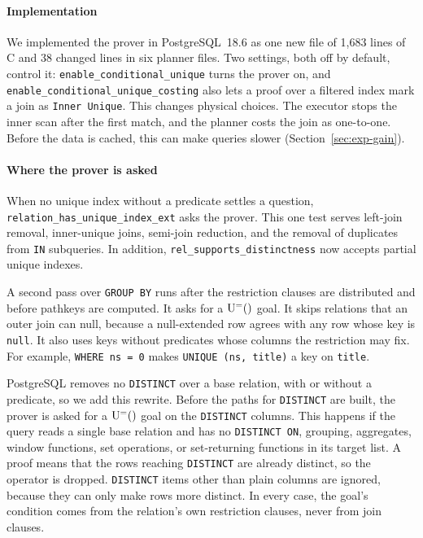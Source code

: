 \documentclass[conference]{IEEEtran}
\theoremstyle{definition}
\newcommand{\sql}[1]{\texttt{#1}}
\newcommand{\nul}{\texttt{null}}
\newcommand{\Ueq}[1]{\mathrm{U}^{=}(#1)}
\begin{document}
\paragraph*{Implementation} We implemented the prover in PostgreSQL~18.6 as one new file of 1{,}683 lines of C and
38 changed lines in six planner files. Two settings, both off by default, control it: \sql{enable\_conditional\_unique} turns the prover on,
and \sql{enable\_conditional\_unique\_costing} also lets a proof over a filtered index mark a join as
\sql{Inner Unique}. This changes physical choices. The executor stops the
inner scan after the first match, and the planner costs the join as one-to-one. Before the data is cached, this can make
queries slower (Section~\ref{sec:exp-gain}).

\paragraph*{Where the prover is asked} When no unique index without a predicate settles a question,
\sql{relation\_has\_unique\_index\_ext} asks the prover. This one test serves left-join removal, inner-unique joins,
semi-join reduction, and the removal of duplicates from \sql{IN} subqueries. In addition, \sql{rel\_supports\_distinctness}
now accepts partial unique indexes.

A second pass over \sql{GROUP BY} runs after the restriction clauses are distributed and before pathkeys are computed.
It asks for a $\Ueq$ goal. It skips relations that an outer join can null, because a null-extended row agrees with any row
whose key is \nul. It also uses keys without predicates whose columns the restriction may fix. For example,
\sql{WHERE ns = 0} makes \sql{UNIQUE (ns, title)} a key on \sql{title}.

PostgreSQL removes no \sql{DISTINCT} over a base relation, with or without a predicate, so we add this rewrite. Before
the paths for \sql{DISTINCT} are built, the prover is asked for a $\Ueq$ goal on the \sql{DISTINCT} columns. This happens
if the query reads a single base relation and has no \sql{DISTINCT ON}, grouping, aggregates, window functions, set
operations, or set-returning functions in its target list. A proof means that the rows reaching \sql{DISTINCT} are already
distinct, so the operator is dropped. \sql{DISTINCT} items other than plain columns are ignored, because they can only make
rows more distinct. In every case, the goal's condition comes from the relation's own restriction clauses, never from join
clauses.
\end{document}
